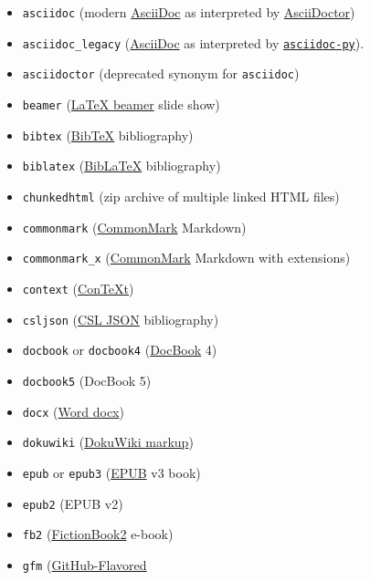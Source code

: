 \documentclass[
  a4paper,
]{article}
\providecommand{\tightlist}{%
  \setlength{\itemsep}{0pt}\setlength{\parskip}{0pt}}
\begin{document}
\begin{description}
\hypertarget{output-formats}{}
\begin{itemize}
\tightlist
\item
  \texttt{asciidoc} (modern
  \href{https://www.methods.co.nz/asciidoc/}{AsciiDoc} as interpreted by
  \href{https://asciidoctor.org/}{AsciiDoctor})
\item
  \texttt{asciidoc\_legacy}
  (\href{https://www.methods.co.nz/asciidoc/}{AsciiDoc} as interpreted
  by
  \href{https://github.com/asciidoc-py/asciidoc-py}{\texttt{asciidoc-py}}).
\item
  \texttt{asciidoctor} (deprecated synonym for \texttt{asciidoc})
\item
  \texttt{beamer} (\href{https://ctan.org/pkg/beamer}{LaTeX beamer}
  slide show)
\item
  \texttt{bibtex} (\href{https://ctan.org/pkg/bibtex}{BibTeX}
  bibliography)
\item
  \texttt{biblatex} (\href{https://ctan.org/pkg/biblatex}{BibLaTeX}
  bibliography)
\item
  \texttt{chunkedhtml} (zip archive of multiple linked HTML files)
\item
  \texttt{commonmark} (\href{https://commonmark.org}{CommonMark}
  Markdown)
\item
  \texttt{commonmark\_x} (\href{https://commonmark.org}{CommonMark}
  Markdown with extensions)
\item
  \texttt{context} (\href{https://www.contextgarden.net/}{ConTeXt})
\item
  \texttt{csljson}
  (\href{https://citeproc-js.readthedocs.io/en/latest/csl-json/markup.html}{CSL
  JSON} bibliography)
\item
  \texttt{docbook} or \texttt{docbook4}
  (\href{https://docbook.org}{DocBook} 4)
\item
  \texttt{docbook5} (DocBook 5)
\item
  \texttt{docx}
  (\href{https://en.wikipedia.org/wiki/Office_Open_XML}{Word docx})
\item
  \texttt{dokuwiki} (\href{https://www.dokuwiki.org/dokuwiki}{DokuWiki
  markup})
\item
  \texttt{epub} or \texttt{epub3} (\href{http://idpf.org/epub}{EPUB} v3
  book)
\item
  \texttt{epub2} (EPUB v2)
\item
  \texttt{fb2}
  (\href{http://www.fictionbook.org/index.php/Eng:XML_Schema_Fictionbook_2.1}{FictionBook2}
  e-book)
\item
  \texttt{gfm}
  (\href{https://help.github.com/articles/github-flavored-markdown/}{GitHub-Flavored
}
\end{itemize}
\end{description}
\end{document}

